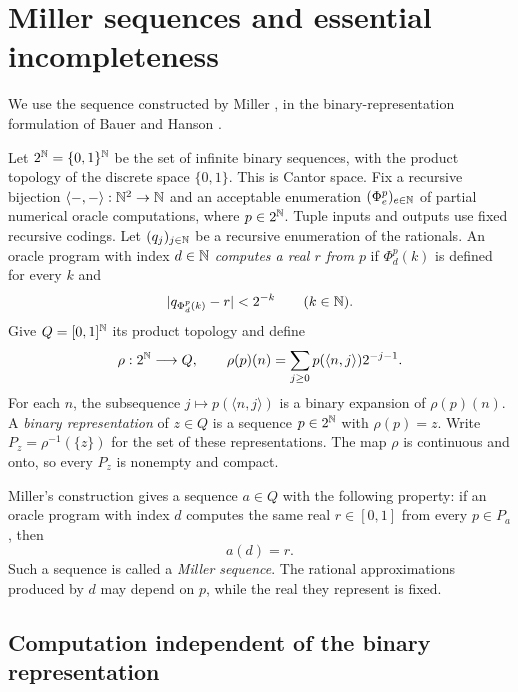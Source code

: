 \section{Miller sequences and essential incompleteness}\label{sec:miller}

We use the sequence constructed by Miller
\cite[Theorem~6.3 and the following paragraph]{Miller2004}, in the
binary-representation formulation of Bauer and Hanson
\cite[Section~2.1 and Theorem~2.2]{BauerHanson}.

Let $2^{\mathbb N}=\{0,1\}^{\mathbb N}$ be the set of infinite binary sequences,
with the product topology of the discrete space $\{0,1\}$.
This is Cantor space.
Fix a recursive bijection $\langle-,-\rangle:\mathbb N^2\to\mathbb N$ and an
acceptable enumeration $(\Phi_e^p)_{e\in\mathbb N}$ of partial numerical
oracle computations, where $p\in2^{\mathbb N}$. Tuple inputs and outputs use
fixed recursive codings. Let $(q_j)_{j\in\mathbb N}$ be a recursive enumeration
of the rationals. An oracle program with index $d\in\mathbb N$
\emph{computes a real $r$ from $p$}
if $\Phi_d^p(k)$ is defined for every $k$ and
\[
 |q_{\Phi_d^p(k)}-r|<2^{-k}\qquad(k\in\mathbb N).
\]
Give $Q=[0,1]^{\mathbb N}$ its product topology and define
\[
 \rho:2^{\mathbb N}\longrightarrow Q,\qquad
 \rho(p)(n)=\sum_{j\geq0}p(\langle n,j\rangle)2^{-j-1}.
\]
For each $n$, the subsequence $j\mapsto p(\langle n,j\rangle)$
is a binary expansion of $\rho(p)(n)$.
A \emph{binary representation} of $z\in Q$ is a sequence
$p\in2^{\mathbb N}$ with $\rho(p)=z$. Write
$P_z=\rho^{-1}(\{z\})$ for the set of these representations.
The map $\rho$ is continuous and onto, so every $P_z$ is nonempty
and compact.

Miller's construction gives a sequence $a\in Q$ with the following
property: if an oracle program with index $d$ computes the same real $r\in[0,1]$ from
every $p\in P_a$, then
\begin{equation}\label{eq:miller-property}
 a(d)=r.
\end{equation}
Such a sequence is called a \emph{Miller sequence}.
The rational approximations produced by $d$ may depend on $p$,
while the real they represent is fixed.

\subsection{Computation independent of the binary representation}
\label{sec:miller-category}

